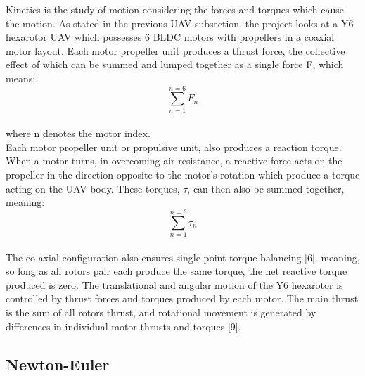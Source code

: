 \documentclass[12pt,a4paper,twoside]{report}
\begin{document}
				Kinetics is the study of motion considering the forces and torques which cause the motion. As stated in the previous UAV subsection, the project looks at a Y6 hexarotor UAV which possesses 6 BLDC motors with propellers in a coaxial motor layout. Each motor propeller unit produces a thrust force, the collective effect of which can be summed and lumped together as a single force F, which means:
				\\
				\[\sum_{n = 1}^{n = 6}F_n\]
				\\
				where n denotes the motor index.
				\\
				Each motor propeller unit or propulsive unit, also produces a reaction torque. When a motor turns, in overcoming air resistance, a reactive force acts on the propeller in the direction opposite to the motor's rotation which produce a torque acting on the UAV body. These torques, $\tau$, can then also be summed together, meaning:
				\\
				\[\sum_{n = 1}^{n = 6}\tau_n\] 
				\\
				The co-axial configuration also ensures single point torque balancing [6]. meaning, so long as all rotors pair each produce the same torque, the net reactive torque produced is zero. The translational and angular motion of the Y6 hexarotor is controlled by thrust forces and torques produced by each motor. The main thrust is the sum of all rotors thrust, and rotational movement is generated by differences in individual  motor thrusts and torques [9].
				
				\subsection*{Newton-Euler}
				
\end{document}
